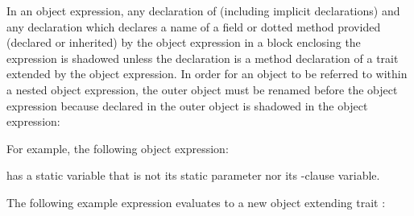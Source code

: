 In an object expression,
any declaration of  (including implicit declarations)
and any declaration which declares a name of a field or dotted method provided
(declared or inherited) by the object expression
in a block enclosing the expression is shadowed
unless the declaration is a method declaration
of a trait extended by the object expression.
In order for an object to be referred to within a nested object expression,
the outer object must be renamed before the object expression
because  declared in the outer object
is shadowed in the object expression:




For example, the following object expression:

has a static variable  that is not its static parameter
nor its -clause variable.



The following example expression evaluates to a new object extending
trait :

